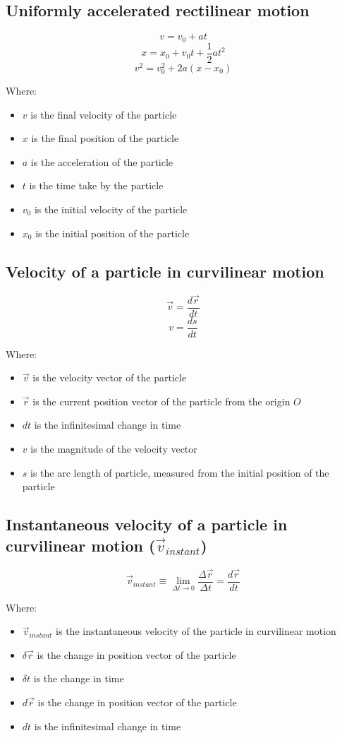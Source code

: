 \documentclass[11pt]{article}
\begin{document}
\subsection{Uniformly accelerated rectilinear motion}
\label{sec:orga6c8491}
\[v = v_0 + at\]
\[x = x_0 + v_0t + \frac{1}{2}at^2\]
\[v^2 = v_0^2 + 2a(x - x_0)\]

Where:
\begin{itemize}
\item \(v\) is the final velocity of the particle
\item \(x\) is the final position of the particle
\item \(a\) is the acceleration of the particle
\item \(t\) is the time take by the particle
\item \(v_0\) is the initial velocity of the particle
\item \(x_0\) is the initial position of the particle
\end{itemize}
\subsection{Velocity of a particle in curvilinear motion}
\label{sec:orgcc398fe}
\[\vec{v} = \frac{d \vec{r}}{dt}\]
\[v = \frac{ds}{dt}\]

Where:
\begin{itemize}
\item \(\vec{v}\) is the velocity vector of the particle
\item \(\vec{r}\) is the current position vector of the particle from the origin \(O\)
\item \(dt\) is the infinitesimal change in time
\item \(v\) is the magnitude of the velocity vector
\item \(s\) is the arc length of particle, measured from the initial position of the particle
\end{itemize}
\subsection{Instantaneous velocity of a particle in curvilinear motion (\(\vec{v}_{instant}\))}
\label{sec:org62bc82e}
\[\vec{v}_{instant} \equiv \lim_{\Delta t \rightarrow 0} \frac{\Delta \vec{r}}{\Delta t} = \frac{d \vec{r}}{dt}\]

Where:
\begin{itemize}
\item \(\vec{v}_{instant}\) is the instantaneous velocity of the particle in curvilinear motion
\item \(\delta \vec{r}\) is the change in position vector of the particle
\item \(\delta t\) is the change in time
\item \(d \vec{r}\) is the change in position vector of the particle
\item \(dt\) is the infinitesimal change in time
\end{itemize}
\end{document}
